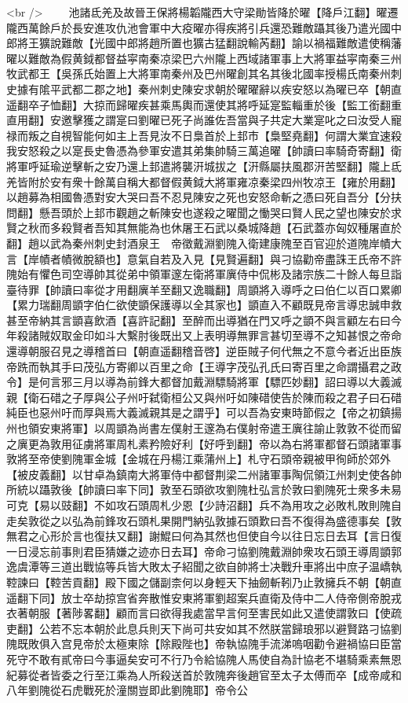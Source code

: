 <br />
　　池諸氐羌及故晉王保將楊韜隴西大守梁勛皆降於曜【降戶江翻】曜遷隴西萬餘戶於長安進攻仇池會軍中大疫曜亦得疾將引兵還恐難敵躡其後乃遣光國中郎將王獷說難敵【光國中郎將趙所置也獷古猛翻說輸芮翻】諭以禍福難敵遣使稱藩曜以難敵為假黄鉞都督益寜南秦凉梁巴六州隴上西域諸軍事上大將軍益寜南秦三州牧武都王【吳孫氏始置上大將軍南秦州及巴州曜創其名其後北國率授楊氏南秦州刺史據有隂平武都二郡之地】秦州刺史陳安求朝於曜曜辭以疾安怒以為曜已卒【朝直遥翻卒子恤翻】大掠而歸曜疾甚乘馬輿而還使其將呼延寔監輜重於後【監工銜翻重直用翻】安邀擊獲之謂寔曰劉曜已死子尚誰佐吾當與子共定大業寔叱之曰汝受人寵禄而叛之自視智能何如主上吾見汝不日梟首於上邽市【梟堅堯翻】何謂大業宜速殺我安怒殺之以寔長史魯憑為參軍安遣其弟集帥騎三萬追曜【帥讀曰率騎奇寄翻】衛將軍呼延瑜逆擊斬之安乃還上邽遣將襲汧城拔之【汧縣屬扶風郡汧苦堅翻】隴上氐羌皆附於安有衆十餘萬自稱大都督假黄鉞大將軍雍凉秦梁四州牧凉王【雍於用翻】以趙募為相國魯憑對安大哭曰吾不忍見陳安之死也安怒命斬之憑曰死自吾分【分扶問翻】懸吾頭於上邽市觀趙之斬陳安也遂殺之曜聞之慟哭曰賢人民之望也陳安於求賢之秋而多殺賢者吾知其無能為也休屠王石武以桑城降趙【石武蓋亦匈奴種屠直於翻】趙以武為秦州刺史封酒泉王　帝徵戴淵劉隗入衛建康隗至百官迎於道隗岸幘大言【岸幘者幘微脫額也】意氣自若及入見【見賢遍翻】與刁協勸帝盡誅王氏帝不許隗始有懼色司空導帥其從弟中領軍邃左衛將軍廙侍中侃彬及諸宗族二十餘人每旦詣臺待罪【帥讀曰率從才用翻廙羊至翻又逸職翻】周顗將入導呼之曰伯仁以百口累卿【累力瑞翻周顗字伯仁欲使顗保護導以全其家也】顗直入不顧既見帝言導忠誠申救甚至帝納其言顗喜飲酒【喜許記翻】至醉而出導猶在門又呼之顗不與言顧左右曰今年殺諸賊奴取金印如斗大繫肘後既出又上表明導無罪言甚切至導不之知甚恨之帝命還導朝服召見之導稽首曰【朝直遥翻稽音啓】逆臣賊子何代無之不意今者近出臣族帝跣而執其手曰茂弘方寄卿以百里之命【王導字茂弘孔氏曰寄百里之命謂攝君之政令】是何言邪三月以導為前鋒大都督加戴淵驃騎將軍【驃匹妙翻】詔曰導以大義滅親【衛石碏之子厚與公子州吁弑衛桓公又與州吁如陳碏使告於陳而殺之君子曰石碏純臣也惡州吁而厚與焉大義滅親其是之謂乎】可以吾為安東時節假之【帝之初鎮揚州也領安東將軍】以周顗為尚書左僕射王邃為右僕射帝遣王廙往諭止敦敦不從而留之廙更為敦用征虜將軍周札素矜險好利【好呼到翻】帝以為右將軍都督石頭諸軍事敦將至帝使劉隗軍金城【金城在丹楊江乘蒲州上】札守石頭帝親被甲徇師於郊外【被皮義翻】以甘卓為鎮南大將軍侍中都督荆梁二州諸軍事陶侃領江州刺史使各帥所統以躡敦後【帥讀曰率下同】敦至石頭欲攻劉隗杜弘言於敦曰劉隗死士衆多未易可克【易以豉翻】不如攻石頭周札少恩【少詩沼翻】兵不為用攻之必敗札敗則隗自走矣敦從之以弘為前鋒攻石頭札果開門納弘敦據石頭歎曰吾不復得為盛德事矣【敦無君之心形於言也復扶又翻】謝鯤曰何為其然也但使自今以往日忘日去耳【言日復一日浸忘前事則君臣猜嫌之迹亦日去耳】帝命刁協劉隗戴淵帥衆攻石頭王導周顗郭逸虞潭等三道出戰協等兵皆大敗太子紹聞之欲自帥將士决戰升車將出中庶子温嶠執鞚諫曰【鞚苦貢翻】殿下國之儲副柰何以身輕天下抽劒斬靷乃止敦擁兵不朝【朝直遥翻下同】放士卒劫掠宫省奔散惟安東將軍劉超案兵直衛及侍中二人侍帝側帝脫戎衣著朝服【著陟畧翻】顧而言曰欲得我處當早言何至害民如此又遣使謂敦曰【使疏吏翻】公若不忘本朝於此息兵則天下尚可共安如其不然朕當歸琅邪以避賢路刁協劉隗既敗俱入宫見帝於太極東除【除殿陛也】帝執協隗手流涕嗚咽勸令避禍協曰臣當死守不敢有貳帝曰今事逼矣安可不行乃令給協隗人馬使自為計協老不堪騎乘素無恩紀募從者皆委之行至江乘為人所殺送首於敦隗奔後趙官至太子太傅而卒【成帝咸和八年劉隗從石虎戰死於潼關豈即此劉隗耶】帝令公